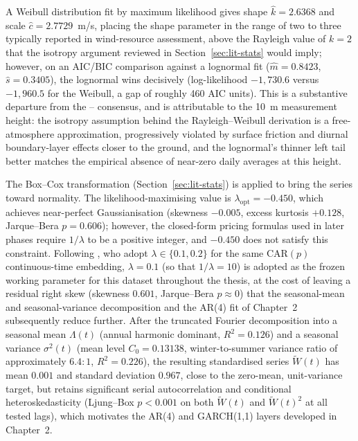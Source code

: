 \documentclass[11pt, a4paper, twoside]{article}
\begin{document}
A Weibull distribution fit by maximum likelihood gives shape $\hat k = 2.6368$ and scale $\hat c = 2.7729$~m/s, placing the shape parameter in the range of two to three typically reported in wind-resource assessment, above the Rayleigh value of $k = 2$ that the \citet{TullerBrett1984} isotropy argument reviewed in Section~\ref{sec:lit-stats} would imply; however, on an AIC/BIC comparison against a lognormal fit ($\hat m = 0.8423$, $\hat s = 0.3405$), the lognormal wins decisively (log-likelihood $-1{,}730.6$ versus $-1{,}960.5$ for the Weibull, a gap of roughly 460 AIC units). This is a substantive departure from the \citet{TullerBrett1984}--\citet{Garcia1998} consensus, and is attributable to the 10~m measurement height: the isotropy assumption behind the Rayleigh--Weibull derivation is a free-atmosphere approximation, progressively violated by surface friction and diurnal boundary-layer effects closer to the ground, and the lognormal's thinner left tail better matches the empirical absence of near-zero daily averages at this height.

The Box--Cox transformation (Section~\ref{sec:lit-stats}) is applied to bring the series toward normality. The likelihood-maximising value is $\lambda_{\text{opt}} = -0.450$, which achieves near-perfect Gaussianisation (skewness $-0.005$, excess kurtosis $+0.128$, Jarque--Bera $p = 0.606$); however, the closed-form pricing formulas used in later phases require $1/\lambda$ to be a positive integer, and $-0.450$ does not satisfy this constraint. Following \citet{BenthSaltyteBenth2009}, who adopt $\lambda \in \{0.1, 0.2\}$ for the same CAR$(p)$ continuous-time embedding, $\lambda = 0.1$ (so that $1/\lambda = 10$) is adopted as the frozen working parameter for this dataset throughout the thesis, at the cost of leaving a residual right skew (skewness $0.601$, Jarque--Bera $p \approx 0$) that the seasonal-mean and seasonal-variance decomposition and the AR(4) fit of Chapter~2 subsequently reduce further. After the truncated Fourier decomposition into a seasonal mean $\Lambda(t)$ (annual harmonic dominant, $R^2 = 0.126$) and a seasonal variance $\sigma^2(t)$ (mean level $C_0 = 0.13138$, winter-to-summer variance ratio of approximately $6.4{:}1$, $R^2 = 0.226$), the resulting standardised series $\widetilde W(t)$ has mean $0.001$ and standard deviation $0.967$, close to the zero-mean, unit-variance target, but retains significant serial autocorrelation and conditional heteroskedasticity (Ljung--Box $p < 0.001$ on both $\widetilde W(t)$ and $\widetilde W(t)^2$ at all tested lags), which motivates the AR(4) and GARCH(1,1) layers developed in Chapter~2.
\end{document}
